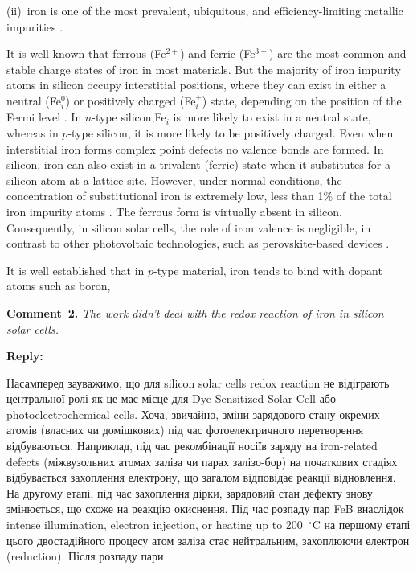 \documentclass[a4paper,fleqn]{cas-sc}
\begin{document}
\begin{mdframed}
(ii)~iron is one of the most prevalent, ubiquitous, and efficiency-limiting metallic impurities \cite{Buonassisi2006, IronSC}.

\begin{tcolorbox}
\textcolor[rgb]{1.00,0.07,0.00}{
It is well known that ferrous (Fe$^{2+}$) and ferric (Fe$^{3+}$) are the most common and stable charge states of iron in most materials.
But the majority of iron impurity atoms in silicon occupy interstitial positions,
where they can exist in either a neutral (Fe$_i^0$) or positively charged (Fe$_i^+$) state,
depending on the position of the Fermi level \cite{Macdonald2004,Istratov1999}.
In $n$-type silicon,Fe$_i$ is more likely to exist in a neutral state,
whereas in $p$-type silicon, it is more likely to be positively charged.
Even when interstitial iron forms complex point defects no valence bonds are formed.
In silicon, iron can also exist in a trivalent (ferric) state when it substitutes for a silicon atom at a lattice site.
However, under normal conditions, the concentration of substitutional iron is extremely low, less than 1\% of the total iron impurity atoms \cite{Wright2016}.
The ferrous form is virtually absent in silicon.
Consequently, in silicon solar cells, the role of iron valence is negligible,
in contrast to other photovoltaic technologies, such as perovskite-based devices \cite{Poindexter2017}.}%
\end{tcolorbox}

It is well established that in $p$-type material,
iron tends to bind with dopant atoms such as boron,
\end{mdframed}

\vspace{1cm}
\noindent
\textcolor[rgb]{0.00,0.50,1.00}{\textbf{Comment~2.}}
\emph{The work didn't deal with the redox reaction of iron in silicon solar cells.}

\noindent
\textcolor[rgb]{0.51,0.00,0.00}{\textbf{Reply:}}


Насамперед зауважимо, що для silicon solar cells redox reaction не відіграють центральної ролі як це має місце для Dye-Sensitized Solar Cell або photoelectrochemical cells.
Хоча, звичайно, зміни зарядового стану окремих атомів (власних чи домішкових) під час фотоелектричного перетворення відбуваються.
Наприклад, під час рекомбінації носіїв заряду на iron-related defects (міжвузольних атомах заліза чи парах залізо-бор) на початкових стадіях відбувається захоплення електрону,
що загалом відповідає реакції відновлення.
На другому етапі, під час захоплення дірки, зарядовий стан дефекту знову змінюється,
що схоже на реакцію окиснення.
Під час розпаду пар FeB внаслідок  intense illumination, electron injection, or heating up to 200~$^\circ$C на першому етапі цього двостадійного процесу
атом заліза стає нейтральним, захоплюючи електрон (reduction).
Після розпаду пари 
\end{document}
